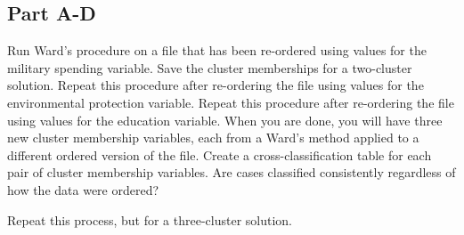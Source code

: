 \documentclass{article}\usepackage[]{graphicx}\usepackage[]{color}
\begin{document}
\subsection{Part A-D}
Run Ward’s procedure on a file that has been re-ordered using values for the military spending variable. Save the cluster memberships for a two-cluster solution. Repeat this procedure after re-ordering the file using values for the environmental protection variable. Repeat this procedure after re-ordering the file using values for the education variable. When you are done, you will have three new cluster membership variables, each from a Ward’s method applied to a different ordered version of the file. Create a cross-classification table for each pair of cluster membership variables. Are cases classified consistently regardless of how the data were ordered? 

Repeat this process, but for a three-cluster solution.
\end{document}
